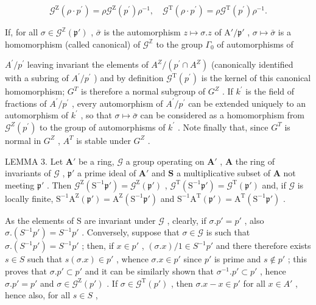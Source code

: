 \[
\mathcal {G} ^ {\mathrm{Z}} (\rho \cdot p ^ {\prime}) = \rho \mathcal {G} ^ {\mathrm{Z}} (p ^ {\prime}) \rho^ {- 1}, \quad \mathcal {G} ^ {\mathrm{T}} (\rho \cdot p ^ {\prime}) = \rho \mathcal {G} ^ {\mathrm{T}} (p ^ {\prime}) \rho^ {- 1}.\tag{2}
\]

If, for all \(\sigma \in \mathcal{G}^{\mathbb{Z}}(\mathfrak{p}')\) , \(\bar{\sigma}\) is the automorphism \(z \mapsto \sigma. z\) of \(\mathrm{A}' / \mathfrak{p}'\) , \(\sigma \mapsto \bar{\sigma}\) is a homomorphism (called canonical) of \(\mathcal{G}^{\mathbb{Z}}\) to the group \(\Gamma_0\) of automorphisms of

\(A^{\prime}/p^{\prime}\) leaving invariant the elements of \(A^{Z}/(p^{\prime} \cap A^{Z})\) (canonically identified with a subring of \(A^{\prime}/p^{\prime}\) ) and by definition \(\mathcal{G}^{\mathrm{T}}(p^{\prime})\) is the kernel of this canonical homomorphism; \(G^{T}\) is therefore a normal subgroup of \(G^{Z}\) . If \(k^{\prime}\) is the field of fractions of \(A^{\prime}/p^{\prime}\) , every automorphism of \(A^{\prime}/p^{\prime}\) can be extended uniquely to an automorphism of \(k^{\prime}\) , so that \(\sigma \mapsto \bar{\sigma}\) can be considered as a homomorphism from \(\mathcal{G}^{Z}(p^{\prime})\) to the group of automorphisms of \(k^{\prime}\) . Note finally that, since \(G^{T}\) is normal in \(G^{Z}\) , \(A^{T}\) is stable under \(G^{Z}\) .

LEMMA 3. Let \(\mathbf{A}'\) be a ring, \(\mathcal{G}\) a group operating on \(\mathbf{A}'\) , \(\mathbf{A}\) the ring of invariants of \(\mathcal{G}\) , \(\mathfrak{p}'\) a prime ideal of \(\mathbf{A}'\) and \(\mathbf{S}\) a multiplicative subset of \(\mathbf{A}\) not meeting \(\mathfrak{p}'\) . Then \(\mathcal{G}^{\mathrm{Z}}(\mathrm{S}^{-1}\mathfrak{p}') = \mathcal{G}^{\mathrm{Z}}(\mathfrak{p}')\) , \(\mathcal{G}^{\mathrm{T}}(\mathrm{S}^{-1}\mathfrak{p}') = \mathcal{G}^{\mathrm{T}}(\mathfrak{p}')\) and, if \(\mathcal{G}\) is locally finite, \(\mathrm{S}^{-1}\mathrm{A}^{\mathrm{Z}}(\mathfrak{p}') = \mathrm{A}^{\mathrm{Z}}(\mathrm{S}^{-1}\mathfrak{p}')\) and \(\mathrm{S}^{-1}\mathrm{A}^{\mathrm{T}}(\mathfrak{p}') = \mathrm{A}^{\mathrm{T}}(\mathrm{S}^{-1}\mathfrak{p}')\) .

As the elements of S are invariant under \(\mathcal{G}\) , clearly, if \(\sigma. p' = p'\) , also \(\sigma. (S^{-1}p') = S^{-1}p'\) . Conversely, suppose that \(\sigma \in \mathcal{G}\) is such that \(\sigma. (S^{-1}p') = S^{-1}p'\) ; then, if \(x \in p'\) , \((\sigma.x)/1 \in S^{-1}p'\) and there therefore exists \(s \in S\) such that \(s(\sigma.x) \in p'\) , whence \(\sigma.x \in p'\) since \(p'\) is prime and \(s \notin p'\) ; this proves that \(\sigma. p' \subset p'\) and it can be similarly shown that \(\sigma^{-1}. p' \subset p'\) , hence \(\sigma. p' = p'\) and \(\sigma \in \mathcal{G}^{\mathrm{Z}}(p')\) . If \(\sigma \in \mathcal{G}^{\mathrm{T}}(p')\) , then \(\sigma.x - x \in p'\) for all \(x \in A'\) , hence also, for all \(s \in S\) ,

